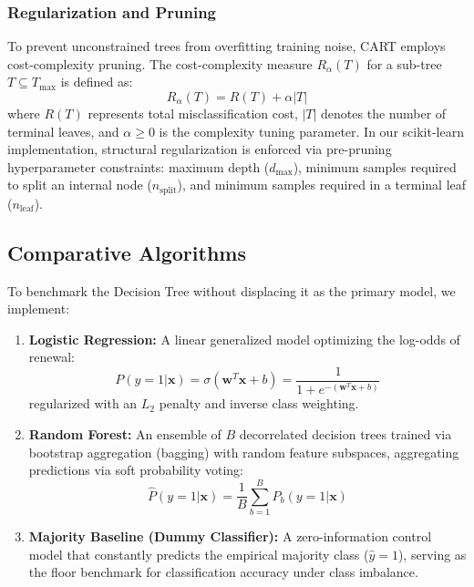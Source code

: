 \documentclass[pdflatex,sn-mathphys-num]{sn-jnl}
\begin{document}
\subsubsection{Regularization and Pruning}
To prevent unconstrained trees from overfitting training noise, CART employs cost-complexity pruning. The cost-complexity measure $R_\alpha(T)$ for a sub-tree $T \subseteq T_{\max}$ is defined as:
\begin{equation}
R_\alpha(T) = R(T) + \alpha |T|
\end{equation}
where $R(T)$ represents total misclassification cost, $|T|$ denotes the number of terminal leaves, and $\alpha \ge 0$ is the complexity tuning parameter. In our scikit-learn implementation, structural regularization is enforced via pre-pruning hyperparameter constraints: maximum depth ($d_{\max}$), minimum samples required to split an internal node ($n_{\text{split}}$), and minimum samples required in a terminal leaf ($n_{\text{leaf}}$).

\subsection{Comparative Algorithms}
To benchmark the Decision Tree without displacing it as the primary model, we implement:
\begin{enumerate}
    \item \textbf{Logistic Regression:} A linear generalized model optimizing the log-odds of renewal:
    \begin{equation}
    P(y=1|\mathbf{x}) = \sigma(\mathbf{w}^T \mathbf{x} + b) = \frac{1}{1 + e^{-(\mathbf{w}^T \mathbf{x} + b)}}
    \end{equation}
    regularized with an $L_2$ penalty and inverse class weighting.
    \item \textbf{Random Forest:} An ensemble of $B$ decorrelated decision trees trained via bootstrap aggregation (bagging) with random feature subspaces, aggregating predictions via soft probability voting:
    \begin{equation}
    \hat{P}(y=1|\mathbf{x}) = \frac{1}{B} \sum_{b=1}^B P_b(y=1|\mathbf{x})
    \end{equation}
    \item \textbf{Majority Baseline (Dummy Classifier):} A zero-information control model that constantly predicts the empirical majority class ($\hat{y} = 1$), serving as the floor benchmark for classification accuracy under class imbalance.
\end{enumerate}
\end{document}
